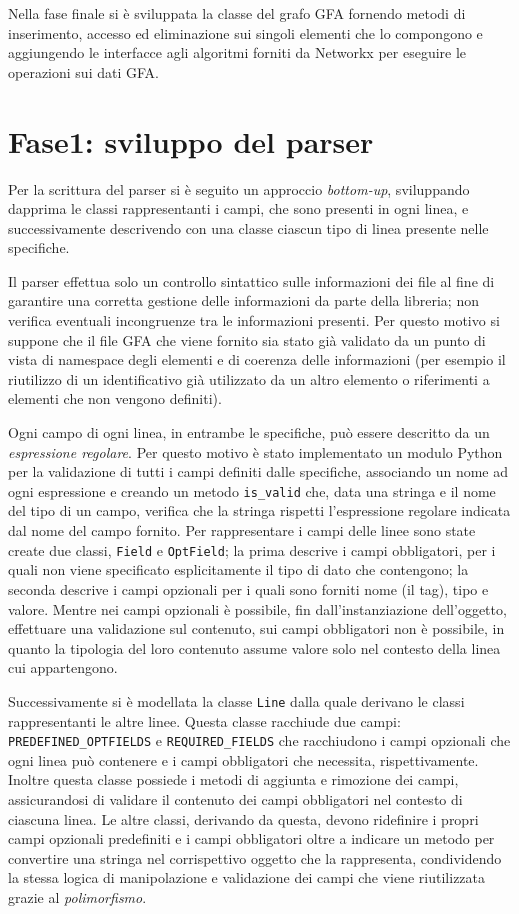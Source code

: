 Nella fase finale si è sviluppata la classe del grafo GFA fornendo
metodi di inserimento, accesso ed eliminazione sui singoli elementi che
lo compongono e aggiungendo le interfacce agli algoritmi forniti da Networkx
per eseguire le operazioni sui dati GFA.

\section{Fase1: sviluppo del parser}
Per la scrittura del parser si è seguito un approccio \emph{bottom-up},
sviluppando dapprima le classi rappresentanti i campi,
che sono presenti in ogni linea, 
e successivamente descrivendo con una classe ciascun tipo
di linea presente nelle specifiche.

Il parser effettua solo un controllo sintattico sulle informazioni dei file
al fine di garantire una corretta gestione delle informazioni da parte
della libreria; non verifica eventuali incongruenze tra le informazioni
presenti. Per questo motivo si suppone che il file GFA che viene fornito
sia stato già validato da un punto di vista di namespace degli elementi
e di coerenza delle informazioni (per esempio il riutilizzo di un identificativo
già utilizzato da un altro elemento o riferimenti a elementi
che non vengono definiti).

Ogni campo di ogni linea, in entrambe le specifiche, può essere descritto
da un \emph{espressione regolare}. Per questo motivo è stato
implementato un modulo Python per la validazione di tutti i campi definiti
dalle specifiche, associando un nome ad ogni espressione e creando un metodo
\texttt{is\_valid} che, data una stringa e il nome del tipo di un campo,
verifica che la stringa rispetti l'espressione regolare indicata dal nome
del campo fornito.
Per rappresentare i campi delle linee sono state create due classi,
\texttt{Field} e \texttt{OptField}; la prima
descrive i campi obbligatori, per i quali non viene specificato
esplicitamente il tipo di dato che contengono; la seconda
descrive i campi opzionali per i quali sono forniti
nome (il tag), tipo e valore. Mentre nei campi opzionali
è possibile, fin dall'instanziazione dell'oggetto, effettuare una validazione
sul contenuto, sui campi obbligatori non è possibile, in quanto
la tipologia del loro contenuto assume valore solo nel contesto
della linea cui appartengono.

Successivamente si è modellata la classe \texttt{Line} dalla quale
derivano le classi rappresentanti le altre linee. Questa classe
racchiude due campi: \texttt{PREDEFINED\_OPTFIELDS}
e \texttt{REQUIRED\_FIELDS} che racchiudono i campi opzionali che
ogni linea può contenere e i campi obbligatori che necessita, rispettivamente.
Inoltre questa classe possiede i metodi di aggiunta e rimozione dei campi,
assicurandosi di validare il contenuto dei campi obbligatori nel contesto
di ciascuna linea. Le altre classi, derivando da questa, devono
ridefinire i propri campi opzionali predefiniti e i campi obbligatori oltre
a indicare un metodo per convertire una stringa
nel corrispettivo oggetto che la rappresenta, condividendo la stessa
logica di manipolazione e validazione dei campi che viene riutilizzata
grazie al \emph{polimorfismo}.


